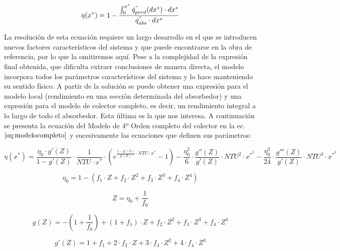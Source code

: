 \documentclass[11pt]{article}
\begin{document}
\begin{equation}
    \eta(x^{*}) = 1 - \frac{\int_{0}^{x^{*}} \dot{q}^{"}_{perd}(dx^{*})\cdot dx^{*}}{\dot{q}^{"}_{abs}\cdot dx^{*}} \label{eq:rendimientonormalizado}
\end{equation}

La resolución de esta ecuación requiere un largo desarrollo en el que se
introducen nuevos factores característicos del sistema y que puede
encontrarse en la obra de referencia, por lo que la omitiremos aquí.
Pese a la complejidad de la expresión final obtenida, que dificulta
extraer conclusiones de manera directa, el modelo incorpora todos los
parámetros característicos del sistema y lo hace manteniendo su sentido
físico. A partir de la solución se puede obtener una expresión para el
modelo local (rendimiento en una sección determinada del absorbedor) y
una expresión para el modelo de colector completo, es decir, un
rendimiento integral a lo largo de todo el absorbedor. Esta última es la
que nos interesa. A continuación se presenta la ecuación del Modelo de
4º Orden completo del colector en la ec.\(\eqref{eq:modelocompleto}\) y
sucesivamente las ecuaciones que definen sus parámetros:

\begin{equation}
    \eta(x^{*}) = \frac{\eta_{0} \cdot g'(Z)}{1-g'(Z)} \cdot \frac{1}{NTU \cdot x^{*}} \cdot \left(e^{\frac{1-g'(Z)}{g'(Z)}\cdot NTU \cdot x^{*}} - 1\right) - \frac{\eta_{0}^2}{6} \cdot \frac{g''(Z)}{g'(Z)} \cdot NTU^{2} \cdot x^{*^{2}} - \frac{\eta_{0}^{3}}{24} \cdot \frac{g'''(Z)}{g'(Z)} \cdot NTU^{3} \cdot x^{*^{3}}
    \label{eq:modelocompleto}
\end{equation}

\begin{equation}
    \eta_{0} = 1 - (f_{1} \cdot Z + f_{2} \cdot Z^{2} + f_{3} \cdot Z^{3} + f_{4} \cdot Z^{4})
    \label{eq:rendimiento0}
\end{equation}

\begin{equation}
    Z = \eta_{0} + \frac{1}{f_{0}} 
    \label{eq:zeta}
\end{equation}

\begin{equation}
    g(Z) = -\left(1+\frac{1}{f_{0}}\right)+(1+f_{1})\cdot Z + f_{2}\cdot Z^{2} +  f_{3}\cdot Z^{3} + f_{4}\cdot Z^{4} 
    \label{eq:gdezeta}
\end{equation}

\begin{equation}
    g'(Z) = 1 + f_{1} + 2 \cdot f_{2} \cdot Z + 3 \cdot f_{3} \cdot Z^{2} + 4 \cdot f_{4} \cdot Z^{3} 
    \label{eq:gprimadezeta}
\end{equation}
\end{document}
